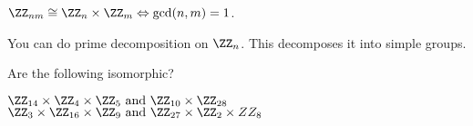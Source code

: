 \documentclass[class=scrartcl, crop=false]{standalone}
\begin{document}
\begin{theorem}
  $\ZZ_{nm} \cong \ZZ_n \times \ZZ_m \Leftrightarrow \gcd(n, m) = 1$.
  \begin{corollary}
    You can do prime decomposition on $\ZZ_n$. This decomposes it into simple groups.
  \end{corollary}
\end{theorem}
\begin{example}
  Are the following isomorphic?
  \begin{enumerate}[label=(\alph*)]
    \ii
    $\ZZ_{14} \times \ZZ_4 \times \ZZ_5 \ \text{and} \ \ZZ_{10} \times \ZZ_{28}$
    \ii
    $\ZZ_3 \times \ZZ_{16} \times \ZZ_9 \ \text{and} \ \ZZ_{27} \times \ZZ_2 \times ZZ_8$
  \end{enumerate}
\end{example}
\end{document}
